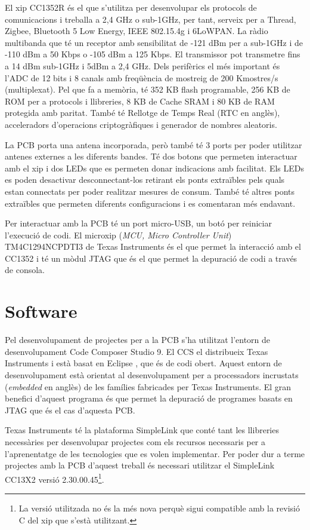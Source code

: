 El xip CC1352R és el que s'utilitza per desenvolupar els protocols de comunicacions i treballa a 2,4 GHz o sub-1GHz, per tant, serveix per a Thread, Zigbee, Bluetooth 5 Low Energy, IEEE 802.15.4g i 6LoWPAN.
La ràdio multibanda que té un receptor amb sensibilitat de -121 dBm per a sub-1GHz i de -110 dBm a 50 Kbps o -105 dBm a 125 Kbps. El transmissor pot transmetre fins a 14 dBm sub-1GHz i 5dBm a 2,4 GHz.
Dels perifèrics el més important és l'ADC de 12 bits i 8 canals amb freqüència de mostreig de 200 Kmostres/s (multiplexat).
Pel que fa a memòria, té 352 KB flash programable, 256 KB de ROM per a protocols i llibreries, 8 KB de Cache SRAM i 80 KB de RAM protegida amb paritat.
També té Rellotge de Temps Real (RTC en anglès), acceleradors d'operacions criptogràfiques i generador de nombres aleatoris.

La PCB porta una antena incorporada, però també té 3 ports per poder utilitzar antenes externes a les diferents bandes.
Té dos botons que permeten interactuar amb el xip i dos LEDs que es permeten donar indicacions amb facilitat.
Els LEDs es poden desactivar desconnectant-los retirant els ponts extraïbles pels quals estan connectats per poder realitzar mesures de consum.
També té altres ponts extraïbles que permeten diferents configuracions i es comentaran més endavant.

Per interactuar amb la PCB té un port micro-USB, un botó per reiniciar l'execució de codi.
El microxip (\textit{MCU, Micro Controller Unit}) TM4C1294NCPDTI3 de Texas Instruments és el que permet la interacció amb el CC1352 i té un mòdul JTAG que és el que permet la depuració de codi a través de consola.


\section{Software}
Pel desenvolupament de projectes per a la PCB s'ha utilitzat l'entorn de desenvolupament Code Composer Studio 9. 
El CCS el distribueix Texas Instruments i està basat en Eclipse \cite{eclipse}, que és de codi obert.
Aquest entorn de desenvolupament està orientat al desenvolupament per a processadors incrustats (\textit{embedded} en anglès) de les famílies fabricades per Texas Instruments.
El gran benefici d'aquest programa és que permet la depuració de programes basats en JTAG que és el cas d'aquesta PCB.

Texas Instruments té la plataforma SimpleLink que conté tant les llibreries necessàries per desenvolupar projectes com els recursos necessaris per a l'aprenentatge de les tecnologies que es volen implementar.
Per poder dur a terme projectes amb la PCB d'aquest treball és necessari utilitzar el SimpleLink CC13X2 versió 2.30.00.45\footnote{La versió utilitzada no és la més nova perquè sigui compatible amb la revisió C del xip que s'està utilitzant.}.

